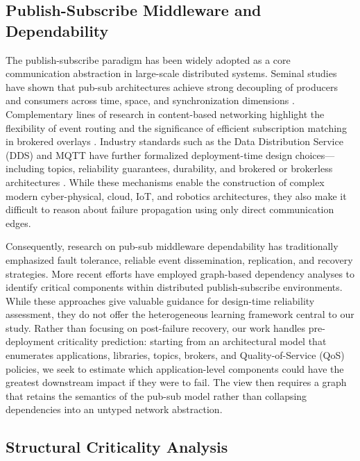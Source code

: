 \documentclass[sigconf,9pt,anonymous]{acmart}
\begin{document}
\subsection{Publish-Subscribe Middleware and Dependability}

The publish-subscribe paradigm has been widely adopted as a core communication abstraction in large-scale distributed systems. Seminal studies have shown that pub-sub architectures achieve strong decoupling of producers and consumers across time, space, and synchronization dimensions \cite{eugster2003many}. Complementary lines of research in content-based networking highlight the flexibility of event routing and the significance of efficient subscription matching in brokered overlays \cite{carzaniga2001design}. Industry standards such as the Data Distribution Service (DDS) and MQTT have further formalized deployment-time design choices—including topics, reliability guarantees, durability, and brokered or brokerless architectures \cite{omg2015dds, banks2019mqtt}. While these mechanisms enable the construction of complex modern cyber-physical, cloud, IoT, and robotics architectures, they also make it difficult to reason about failure propagation using only direct communication edges.

Consequently, research on pub-sub middleware dependability has traditionally emphasized fault tolerance, reliable event dissemination, replication, and recovery strategies. More recent efforts have employed graph-based dependency analyses to identify critical components within distributed publish-subscribe environments. While these approaches give valuable guidance for design-time reliability assessment, they do not offer the heterogeneous learning framework central to our study. Rather than focusing on post-failure recovery, our work handles pre-deployment criticality prediction: starting from an architectural model that enumerates applications, libraries, topics, brokers, and Quality-of-Service (QoS) policies, we seek to estimate which application-level components could have the greatest downstream impact if they were to fail. The view then requires a graph that retains the semantics of the pub-sub model rather than collapsing dependencies into an untyped network abstraction.

\subsection{Structural Criticality Analysis}
\end{document}
